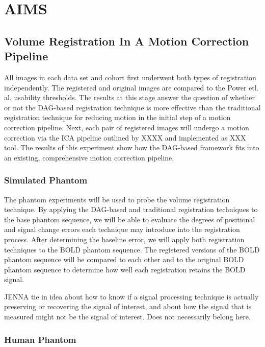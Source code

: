 \chapter{AIMS}

\section{Volume Registration In A Motion Correction Pipeline}

All images in each data set and cohort first underwent both types of registration independently. The registered and original images are compared to the Power etl. al. usability thresholds. The results at this stage answer the question of whether or not the DAG-based registration technique is more effective than the traditional registration technique for reducing motion in the initial step of a motion correction pipeline.  Next, each pair of registered images will undergo a motion correction via the ICA pipeline outlined by XXXX and implemented as XXX tool. The results of this experiment show how the DAG-based framework fits into an existing, comprehensive motion correction pipeline. 

\subsection{Simulated Phantom}

The phantom experiments will be used to probe the volume registration technique. By applying the DAG-based and traditional registration techniques to the base phantom sequence, we will be able to evaluate the degrees of positional and signal change errors each technique may introduce into the registration process. After determining the baseline error, we will apply both registration techniques to the BOLD phantom sequence. The registered versions of the BOLD phantom sequence will be compared to each other and to the original BOLD phantom sequence to determine how well each registration retains the BOLD signal.

JENNA tie in idea about how to know if a signal processing technique is actually preserving or recovering the signal of interest, and about how the signal that is measured might not be the signal of interest. Does not necessarily belong here.

\subsection{Human Phantom}

